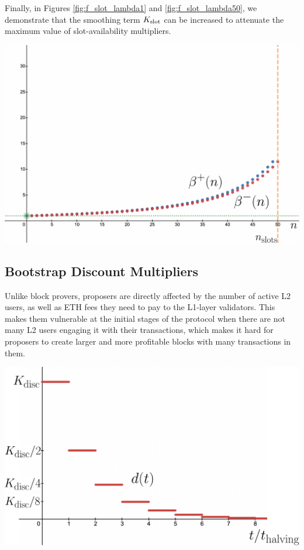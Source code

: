 \documentclass[9pt,oneside]{amsart}
\newenvironment{Figure}
  {\par\medskip\noindent\minipage{\linewidth}}
  {\endminipage\par\medskip}
\begin{document}
\begin{multicols}{2}
Finally, in Figures \ref{fig:f_slot_lambda1} and \ref{fig:f_slot_lambda50}, we demonstrate that the smoothing term $K_\textnormal{slot}$ can be increased to attenuate the maximum value of slot-availability multipliers.

\begin{Figure}
 \centering
 \includegraphics[width=0.8\linewidth]{fig/lambda20.png}
 \label{fig:f_slot_lambda50}
 
\end{Figure}

\subsection{Bootstrap Discount Multipliers}\label{sec:bootstrapping}
Unlike block provers, proposers are directly affected by the number of active L2 users, as well as ETH fees they need to pay to the L1-layer validators. This makes them vulnerable at the initial stages of the protocol when there are not many L2 users engaging it with their transactions, which makes it hard for proposers to create larger and more profitable blocks with many transactions in them.

\begin{Figure}
 \centering
 \includegraphics[width=0.8\linewidth]{fig/discount_func.png}
 \label{fig:discount}
\end{Figure}


\end{multicols}
\end{document}
